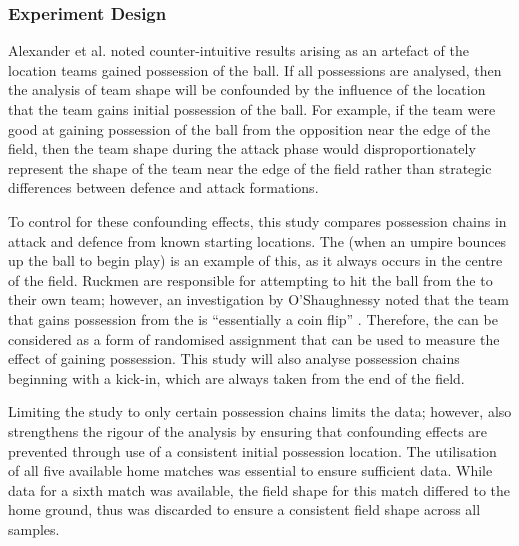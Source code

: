 \subsubsection{Experiment Design}
\label{sec:shapepaper-experiment-design}

Alexander et al. \cite{Alexander2019a} noted counter-intuitive results arising as an artefact of the location teams gained possession of the ball. If all possessions are analysed, then the analysis of team shape will be confounded by the influence of the location that the team gains initial possession of the ball. For example, if the team were good at gaining possession of the ball from the opposition near the edge of the field, then the team shape during the attack phase would disproportionately represent the shape of the team near the edge of the field rather than strategic differences between defence and attack formations.


To control for these confounding effects, this study compares possession chains in attack and defence from known starting locations. The \centrebounce{} (when an umpire bounces up the ball to begin play) is an example of this, as it always occurs in the centre of the field. Ruckmen are responsible for attempting to hit the ball from the \centrebounce{} to their own team; however, an investigation by O'Shaughnessy noted that the team that gains possession from the \centrebounce{} is ``essentially a coin flip'' \cite{oshaughnessy_identification_2016}. Therefore, the \centrebounce{} can be considered as a form of randomised assignment that can be used to measure the effect of gaining possession. This study will also analyse possession chains beginning with a kick-in, which are always taken from the end of the field.

Limiting the study to only certain possession chains limits the data; however, also strengthens the rigour of the analysis by ensuring that confounding effects are prevented through use of a consistent initial possession location. The utilisation of all five available home matches was essential to ensure sufficient data. While data for a sixth match was available, the field shape for this match differed to the home ground, thus was discarded to ensure a consistent field shape across all samples.

